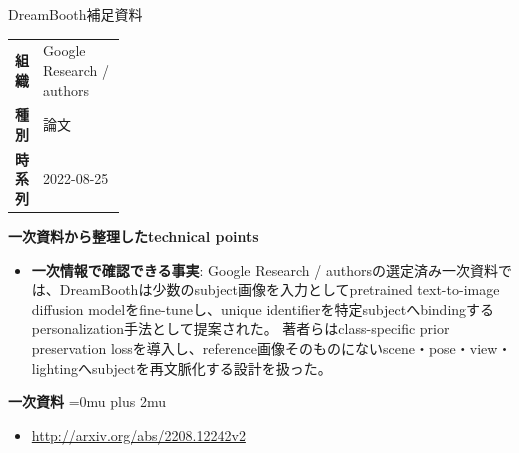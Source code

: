 \begin{technicalnote}{DreamBooth}{補足資料}
\begingroup
\begin{tabularx}{\linewidth}{@{}>{\bfseries}p{0.22\linewidth}X@{}}
組織 & Google Research / authors \\
種別 & 論文 \\
時系列 & 2022-08-25 \\
\end{tabularx}
\smallskip
{\bfseries 一次資料から整理したtechnical points}
\begin{itemize}[leftmargin=1.5em,itemsep=0.35em]
\item \textbf{一次情報で確認できる事実}: Google Research / authorsの選定済み一次資料では、DreamBoothは少数のsubject画像を入力としてpretrained text-to-image diffusion modelをfine-tuneし、unique identifierを特定subjectへbindingするpersonalization手法として提案された。 著者らはclass-specific prior preservation lossを導入し、reference画像そのものにないscene・pose・view・lightingへsubjectを再文脈化する設計を扱った。
\end{itemize}
\begin{minipage}{\linewidth}
\begin{samepage}
{\bfseries 一次資料}
\begingroup\sloppy
\Urlmuskip=0mu plus 2mu\relax
\begin{itemize}[leftmargin=1.5em,itemsep=0.25em]
\item {\scriptsize\url{http://arxiv.org/abs/2208.12242v2}}
\end{itemize}
\endgroup
\end{samepage}
\end{minipage}
\endgroup
\end{technicalnote}
\medskip

